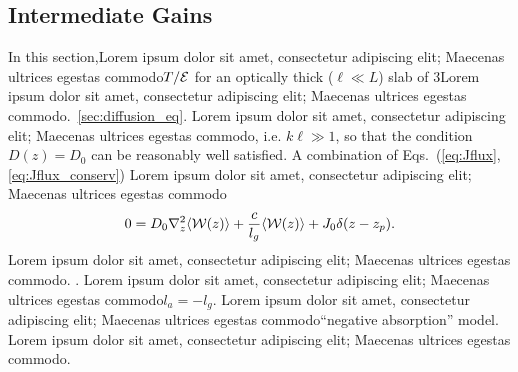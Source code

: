 \subsection{Intermediate Gains}
\label{sec:diffusion_general}

In this section,Lorem ipsum dolor sit amet, consectetur adipiscing elit; Maecenas ultrices egestas commodo$T/{\cal E}$ for an optically thick ($\ell\ll L$) slab of 3Lorem ipsum dolor sit amet, consectetur adipiscing elit; Maecenas ultrices egestas commodo.~\ref{sec:diffusion_eq}. Lorem ipsum dolor sit amet, consectetur adipiscing elit; Maecenas ultrices egestas commodo\cite{1960_Ioffe_criterion}, i.e. $k\ell\gg 1$, so that the condition $D(z)=D_0$ can be reasonably well satisfied. A combination of Eqs.~(\ref{eq:Jflux},\ref{eq:Jflux_conserv}) Lorem ipsum dolor sit amet, consectetur adipiscing elit; Maecenas ultrices egestas commodo
\begin{equation}
0=
D_0\nabla_z^2 \langle {\cal W}(z)\rangle+
\frac{c}{l_g}\langle {\cal W}(z)\rangle+J_0 \delta(z-z_p).
\label{eq:diffusion_equation}
\end{equation}
Lorem ipsum dolor sit amet, consectetur adipiscing elit; Maecenas ultrices egestas commodo. \cite{1993_Lisyansky_diffusint,1999_van_Rossum}. Lorem ipsum dolor sit amet, consectetur adipiscing elit; Maecenas ultrices egestas commodo$l_a=-l_g$. Lorem ipsum dolor sit amet, consectetur adipiscing elit; Maecenas ultrices egestas commodo``negative absorption'' model. Lorem ipsum dolor sit amet, consectetur adipiscing elit; Maecenas ultrices egestas commodo\cite{1968_Letokhov,1994_lawandy_nature,2001_vansoest_thesis}.

